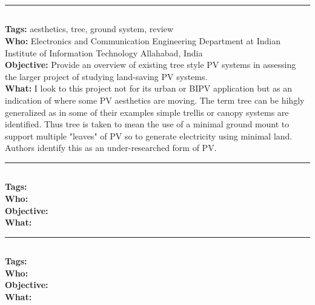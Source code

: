 \documentclass[11pt,a4paper]{article}
\makeatletter
\renewcommand{\maketitle}{\bgroup
   \begin{center}
   \textbf{{\fontsize{18pt}{20}\selectfont \@title}}\\
   \vspace{10pt}
   {\fontsize{12pt}{0}\selectfont \@author} 
   \end{center}
}
\makeatother
\begin{document}

\thispagestyle{fancy}


\noindent\rule{\textwidth}{1pt}
\subsection*{}
\textbf{Tags:} aesthetics, tree, ground system, review \\
\textbf{Who:} Electronics and Communication Engineering Department at Indian Institute of Information Technology Allahabad, India \\
\textbf{Objective:} Provide an overview of existing tree style PV systems in assessing the larger project of studying land-saving PV systems. \\
\textbf{What:} I look to this project not for its urban or BIPV application but as an indication of where some PV aesthetics are moving. The term tree can be hihgly generalized as in some of their examples simple trellis or canopy systems are identified. Thus tree is taken to mean the use of a minimal ground mount to support multiple "leaves" of PV so to generate electricity using minimal land. Authors identify this as an under-researched form of PV.

\noindent\rule{\textwidth}{1pt}
\subsection*{\bibentry{}}
\textbf{Tags:}  \\
\textbf{Who:}  \\
\textbf{Objective:}  \\
\textbf{What:} 

\noindent\rule{\textwidth}{1pt}
\subsection*{\bibentry{}}
\textbf{Tags:}  \\
\textbf{Who:}  \\
\textbf{Objective:}  \\
\textbf{What:} 
\end{document}
